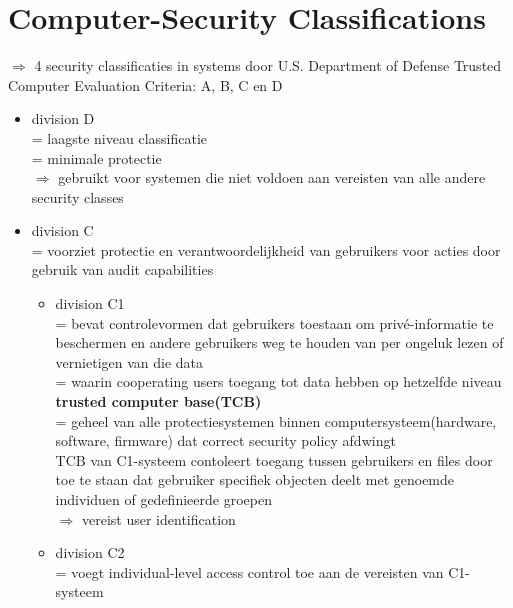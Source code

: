 \documentclass{report}
\begin{document}
\section{Computer-Security Classifications}
$\Rightarrow$ 4 security classificaties in systems door U.S. Department of Defense Trusted Computer Evaluation Criteria: A, B, C en D
\begin{itemize}
\item division D
\\= laagste niveau classificatie
\\= minimale protectie
\\$\Rightarrow$ gebruikt voor systemen die niet voldoen aan vereisten van alle andere security classes
\item division C
\\= voorziet protectie en verantwoordelijkheid van gebruikers voor acties door gebruik van audit capabilities
\begin{itemize}
\item division C1
\\= bevat controlevormen dat gebruikers toestaan om priv\'e-informatie te beschermen en andere gebruikers weg te houden van per ongeluk lezen of vernietigen van die data
\\= waarin cooperating users toegang tot data hebben op hetzelfde niveau
\\\textbf{trusted computer base(TCB)}
\\= geheel van alle protectiesystemen binnen computersysteem(hardware, software, firmware) dat correct security policy afdwingt
\\ TCB van C1-systeem contoleert toegang tussen gebruikers en files door toe te staan dat gebruiker specifiek objecten deelt met genoemde individuen of gedefinieerde groepen
\\$\Rightarrow$ vereist user identification
\item division C2
\\= voegt individual-level access control toe aan de vereisten van C1-systeem


\end{itemize}
\end{itemize}
\end{document}
